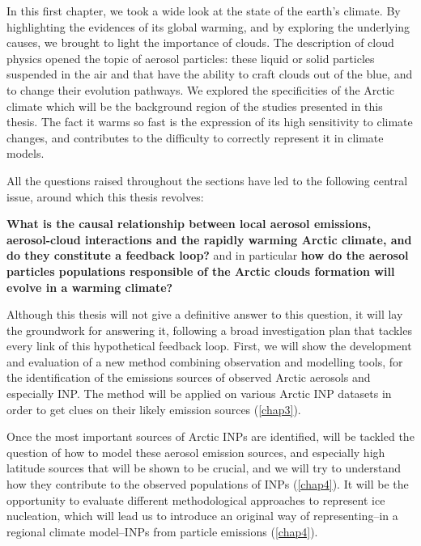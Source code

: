 In this first chapter, we took a wide look at the state of the earth's climate. By highlighting the evidences of its global warming, and by exploring the underlying causes, we brought to light the importance of clouds. 
The description of cloud physics opened the topic of aerosol particles: these liquid or solid particles suspended in the air and that have the ability to craft clouds out of the blue, and to change their evolution pathways.
We explored the specificities of the Arctic climate which will be the background region of the studies presented in this thesis. The fact it warms so fast is the expression of its high sensitivity to climate changes, and contributes to the difficulty to correctly represent it in climate models. 

All the questions raised throughout the sections have led to the following central issue, around which this thesis revolves:

\begin{center}
    \textbf{What is the causal relationship between local aerosol emissions, aerosol-cloud interactions and the rapidly warming Arctic climate, and do they constitute a feedback loop?} %
    and in particular  \textbf{how do the aerosol particles populations responsible of the Arctic clouds formation will evolve in a warming climate?}
\end{center}

Although this thesis will not give a definitive answer to this question, it will lay the groundwork for answering it, following a broad investigation plan that tackles every link of this hypothetical feedback loop.
First, we will show the development and evaluation of a new method combining observation and modelling tools, for the identification of the emissions sources of observed Arctic aerosols and especially INP. The method will be applied on various Arctic INP datasets in order to get clues on their likely emission sources (\cref{chap3}). 

Once the most important sources of Arctic INPs are identified, will be tackled the question of how to model these aerosol emission sources, and especially high latitude sources that will be shown to be crucial, and we will try to understand how they contribute to the observed populations of INPs (\cref{chap4}). It will be the opportunity to evaluate different methodological approaches to represent ice nucleation, which will lead us to introduce an original way of representing\---in a regional climate model\---INPs from particle emissions (\cref{chap4}).

